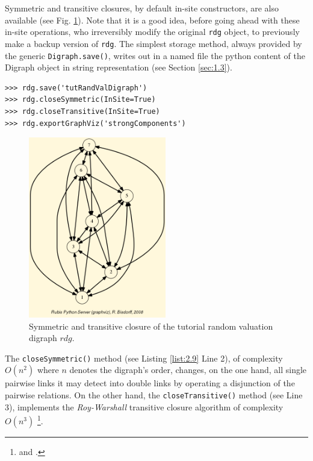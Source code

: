 Symmetric and transitive closures, by default in-site constructors, are also available (see Fig. \ref{fig:2.5}). Note that it is a good idea, before going ahead with these in-site operations, who irreversibly modify the original \texttt{rdg} object, to previously make a backup version of \texttt{rdg}. The simplest storage method, always provided by the generic \texttt{Digraph.save()}, writes out in a named file the python content of the Digraph object in string representation (see Section \ref{sec:1.3}).
\begin{lstlisting}[caption={Symmeric and transitive closures},label=list:2.9]
>>> rdg.save('tutRandValDigraph')
>>> rdg.closeSymmetric(InSite=True)
>>> rdg.closeTransitive(InSite=True)
>>> rdg.exportGraphViz('strongComponents')
\end{lstlisting}
\begin{figure}[h]
\sidecaption[t]
\includegraphics[width=6cm]{Figures/strongComponents.png}
\caption{Symmetric and transitive closure of the tutorial random valuation digraph $rdg$.}
\label{fig:2.5}       %
\end{figure}

The \texttt{closeSymmetric()} method (see Listing \ref{list:2.9}  Line 2), of complexity $O(n^2)$ where $n$ denotes the digraph's order, changes, on the one hand, all single pairwise links it may detect into double links by operating a disjunction of the pairwise relations. On the other hand, the \texttt{closeTransitive()}  method (see Line 3), implements the \emph{Roy-Warshall} transitive closure algorithm of complexity $O(n^3)$ \footnote{\citet{ROY-1959} and \citet{WAR-1962}.}.

